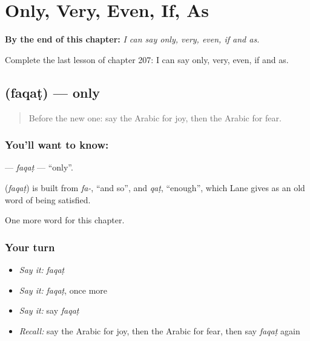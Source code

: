 
\chapter{Only, Very, Even, If, As}
\label{ch:ar-only-very-even-if-as}

\begin{chapteropening}
\textbf{By the end of this chapter:} \emph{I can say only, very, even, if and as.}

Complete the last lesson of chapter 207: I can say only, very, even, if and as.
\end{chapteropening}

\section[\texorpdfstring{\ar{فقط} (faqaṭ)}{فقط (faqaṭ)}]{ (faqaṭ) — only}

\label{lesson:AR-C207-faqat}



\begin{quote}
Before the new one: say the Arabic for joy, then the Arabic for fear.
\end{quote}

\subsection*{You'll want to know: }
\textbf{} — \emph{faqaṭ} — \textquotedblleft{}only\textquotedblright{}.

\begin{cousinweb}
\textbf{} (\emph{faqaṭ}) is built from \emph{fa-}, \textquotedblleft{}and so\textquotedblright{}, and \emph{qaṭ}, \textquotedblleft{}enough\textquotedblright{}, which Lane gives as an old word of being satisfied.
\end{cousinweb}

\begin{grammarlens}[title={What you've built}]
One more word for this chapter.
\end{grammarlens}

\subsection*{Your turn}
\begin{itemize}
\raggedright
  \item \emph{Say it:} \emph{faqaṭ}
  \item \emph{Say it:} \emph{faqaṭ}, once more
  \item \emph{Say it:} say \emph{faqaṭ}
  \item \emph{Recall:} say the Arabic for joy, then the Arabic for fear, then say \emph{faqaṭ} again
\end{itemize}

